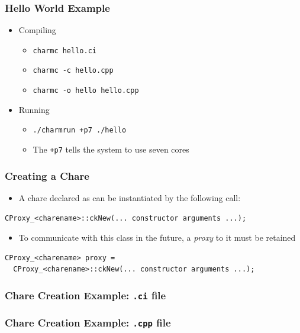 \begin{frame}
  \frametitle{Hello World Example}
  \begin{itemize}
    \item Compiling
      \begin{itemize}
      \item \texttt{charmc hello.ci}
      \item \texttt{charmc -c hello.cpp}
      \item \texttt{charmc -o hello hello.cpp}
      \end{itemize}
    \item Running
      \begin{itemize}
      \item \texttt{./charmrun +p7 ./hello}
      \item The \texttt{+p7} tells the system to use seven cores
      \end{itemize}
    \end{itemize}
\end{frame}

\begin{frame}[fragile]
  \frametitle{Creating a Chare}
  \begin{itemize}
    \item A chare declared as  can be
      instantiated by the following call:
  \end{itemize}
\begin{lstlisting}
CProxy_<charename>::ckNew(... constructor arguments ...);
\end{lstlisting}
  \begin{itemize}
  \item To communicate with this class in the future, a \textit{proxy} to it
    must be retained
  \end{itemize}
\begin{lstlisting}
CProxy_<charename> proxy = 
  CProxy_<charename>::ckNew(... constructor arguments ...);
\end{lstlisting}
\end{frame}

\begin{frame}[fragile]
  \frametitle{Chare Creation Example: \texttt{.ci} file}
  
\end{frame}

\begin{frame}[fragile]
  \frametitle{Chare Creation Example: \texttt{.cpp} file}
  
\end{frame}

